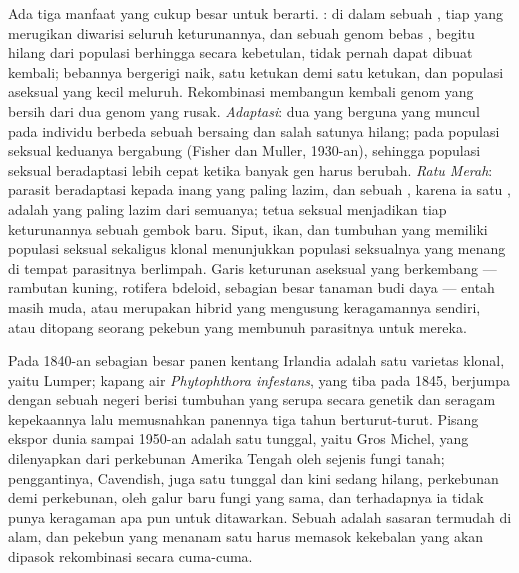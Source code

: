 \begin{proposition}\label{prop:b2:asexual-reproduction:whysex}
Ada tiga manfaat yang cukup besar untuk berarti. \emph{}: di dalam sebuah , tiap  yang merugikan diwarisi
seluruh keturunannya, dan sebuah genom bebas , begitu hilang dari
populasi berhingga secara kebetulan, tidak pernah dapat dibuat kembali;
bebannya bergerigi naik, satu ketukan demi satu ketukan, dan populasi
aseksual yang kecil meluruh. Rekombinasi membangun kembali genom yang
bersih dari dua genom yang rusak. \emph{Adaptasi}: dua  yang
berguna yang muncul pada individu berbeda sebuah  bersaing dan
salah satunya hilang; pada populasi seksual keduanya bergabung (Fisher
dan Muller, 1930-an), sehingga populasi seksual beradaptasi lebih cepat
ketika banyak gen harus berubah. \emph{Ratu Merah}: parasit
beradaptasi kepada  inang yang paling lazim, dan sebuah ,
karena ia satu , adalah yang paling lazim dari semuanya; tetua
seksual menjadikan tiap keturunannya sebuah gembok baru. Siput, ikan,
dan tumbuhan yang memiliki populasi seksual sekaligus klonal
menunjukkan populasi seksualnya yang menang di tempat parasitnya
berlimpah. Garis keturunan aseksual yang berkembang --- rambutan
kuning, rotifera bdeloid, sebagian besar  tanaman budi daya ---
entah masih muda, atau merupakan hibrid  yang mengusung
keragamannya sendiri, atau ditopang seorang pekebun yang membunuh
parasitnya untuk mereka.
\end{proposition}

\begin{example}\label{ex:b2:asexual-reproduction:monoculture}
Pada 1840-an sebagian besar panen kentang Irlandia adalah satu varietas
klonal, yaitu Lumper; kapang air \emph{Phytophthora infestans}, yang
tiba pada 1845, berjumpa dengan sebuah negeri berisi tumbuhan yang
serupa secara genetik dan seragam kepekaannya lalu memusnahkan
panennya tiga tahun berturut-turut. Pisang ekspor dunia sampai 1950-an
adalah satu  tunggal, yaitu Gros Michel, yang dilenyapkan dari
perkebunan Amerika Tengah oleh sejenis fungi tanah; penggantinya,
Cavendish, juga satu  tunggal dan kini sedang hilang, perkebunan
demi perkebunan, oleh galur baru fungi yang sama, dan terhadapnya ia
tidak punya keragaman apa pun untuk ditawarkan. Sebuah  adalah
sasaran termudah di alam, dan pekebun yang menanam satu  harus
memasok kekebalan yang akan dipasok rekombinasi secara cuma-cuma.
\end{example}

